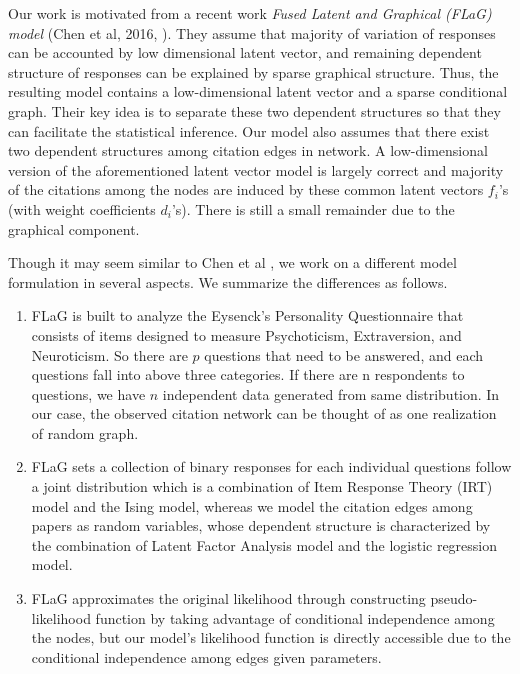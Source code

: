 \documentclass[AMS,STIX1COL]{WileyNJD-v2}
\begin{document}
Our work is motivated from a recent work {\it Fused Latent and Graphical (FLaG) model} (Chen et al, 2016, \cite{chen2016fused}).
They assume that majority of variation of responses can be accounted by low dimensional latent vector, and remaining dependent structure of responses can be explained by sparse graphical structure.
Thus, the resulting model contains a low-dimensional latent vector and a sparse conditional graph.
Their key idea is to separate these two dependent structures so that they can facilitate the statistical inference.
Our model also assumes that there exist two dependent structures among citation edges in network.
A low-dimensional version of the aforementioned latent vector model is largely correct and majority of the citations among the nodes are induced by these common latent vectors $f_{i}$'s (with weight coefficients $d_{i}$'s).
There is still a small remainder due to the graphical component.

Though it may seem similar to Chen et al \cite{chen2016fused}, we work on a different model formulation in several aspects.
We summarize the differences as follows. 
\begin{enumerate}
\item FLaG is built to analyze the Eysenck's Personality Questionnaire that consists of items designed to measure Psychoticism, Extraversion, and Neuroticism.
So there are $p$ questions that need to be answered, and each questions fall into above three categories.
If there are n respondents to questions, we have $n$ independent data generated from same distribution.
In our case, the observed citation network can be thought of as one realization of random graph.

\item FLaG sets a collection of binary responses for each individual questions follow a joint distribution which is a combination of Item Response Theory (IRT) model and the Ising model, whereas we model the citation edges among papers as random variables, whose dependent structure is characterized by the combination of Latent Factor Analysis model and the logistic regression model.

\item FLaG approximates the original likelihood through constructing pseudo-likelihood function by taking advantage of conditional independence among the nodes, but our model's likelihood function is directly accessible due to the conditional independence among edges given parameters.

\end{enumerate}
\end{document}

